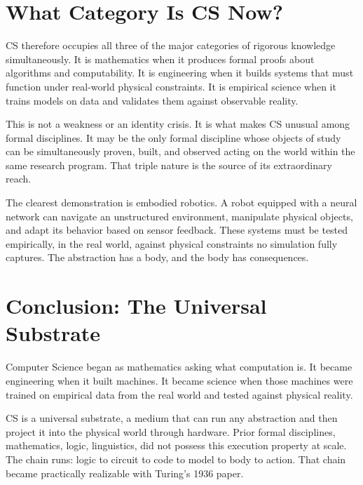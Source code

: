 \documentclass[11pt,a4paper]{article}
\begin{document}
\section{What Category Is CS Now?}

CS therefore occupies all three of the major categories of rigorous knowledge simultaneously. It is mathematics when it produces formal proofs about algorithms and computability. It is engineering when it builds systems that must function under real-world physical constraints. It is empirical science when it trains models on data and validates them against observable reality.

This is not a weakness or an identity crisis. It is what makes CS unusual among formal disciplines. It may be the only formal discipline whose objects of study can be simultaneously proven, built, and observed acting on the world within the same research program. That triple nature is the source of its extraordinary reach.

The clearest demonstration is embodied robotics. A robot equipped with a neural network can navigate an unstructured environment, manipulate physical objects, and adapt its behavior based on sensor feedback. These systems must be tested empirically, in the real world, against physical constraints no simulation fully captures. The abstraction has a body, and the body has consequences.

\section{Conclusion: The Universal Substrate}

Computer Science began as mathematics asking what computation is. It became engineering when it built machines. It became science when those machines were trained on empirical data from the real world and tested against physical reality.

CS is a universal substrate, a medium that can run any abstraction and then project it into the physical world through hardware. Prior formal disciplines, mathematics, logic, linguistics, did not possess this execution property at scale. The chain runs: logic to circuit to code to model to body to action. That chain became practically realizable with Turing's 1936 paper.
\end{document}
